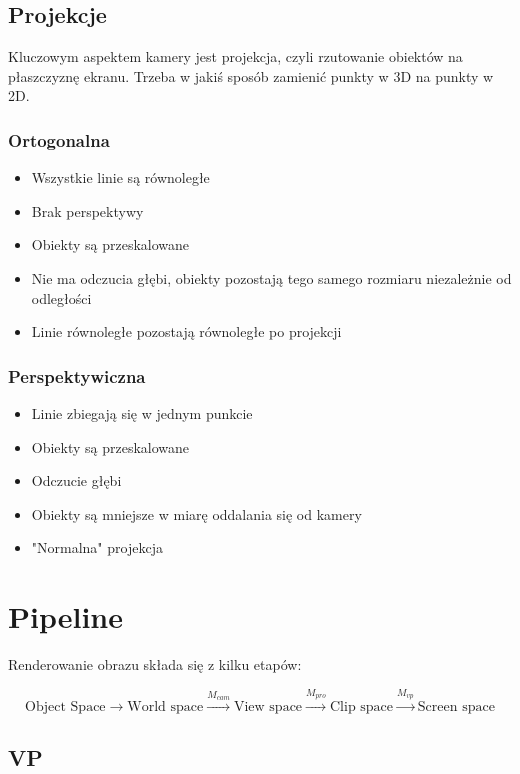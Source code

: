 \documentclass{../notatki}
\begin{document}
\subsection{Projekcje}

Kluczowym aspektem kamery jest projekcja, czyli rzutowanie obiektów na płaszczyznę ekranu.
Trzeba w jakiś sposób zamienić punkty w 3D na punkty w 2D.

\subsubsection{Ortogonalna}

\begin{itemize}
    \item Wszystkie linie są równoległe
    \item Brak perspektywy
    \item Obiekty są przeskalowane
    \item Nie ma odczucia głębi, obiekty pozostają tego samego rozmiaru niezależnie od odległości
    \item Linie równoległe pozostają równoległe po projekcji
\end{itemize}

\subsubsection{Perspektywiczna}

\begin{itemize}
    \item Linie zbiegają się w jednym punkcie
    \item Obiekty są przeskalowane
    \item Odczucie głębi
    \item Obiekty są mniejsze w miarę oddalania się od kamery
    \item "Normalna" projekcja
\end{itemize}

\section{Pipeline}

Renderowanie obrazu składa się z kilku etapów:

$$
\text{Object Space} \rightarrow \text{World space} \overset{M_{cam}}{\rightarrow} \text{View space} \overset{M_{pro}}{\rightarrow} \text{Clip space} \overset{M_{vp}}{\rightarrow} \text{Screen space}
$$

\subsection{VP}
\end{document}
